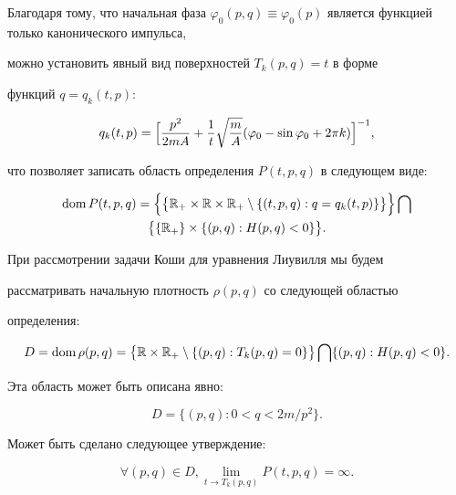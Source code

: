 Благодаря тому, что начальная фаза $\varphi_0(p,q) \equiv

\varphi_0(p)$ является функцией только канонического импульса,

можно установить явный вид поверхностей $T_k(p,q)= t$ в форме

функций $ q= q_k(t,p)$:

$$

q_k(t,p)= \Bigl[ \frac{p^2}{2 mA} +

\frac{1}{t}\sqrt{\frac{m}{A}}(\varphi_0-\sin\varphi_0 + 2 \pi k) \Bigr]^{-1},

$$

 что позволяет записать область определения $P(t,p,q)$ в следующем виде:

\begin{multline*}

\mathop{\rm dom} P(t,p,q) 

= \Bigl\{\bigl\{ \mathbb{R}_{+}\times \mathbb{R}\times

\mathbb{R}_{+} \setminus \{(t,p,q): q= q_k(t,p)\} \bigr\}\Bigr\}\bigcap \\

\bigl \{\{

\mathbb{R}_{+}\}\times\{(p,q): H(p,q)<0 \} \bigr\}.

\end{multline*}

 При рассмотрении задачи Коши для уравнения Лиувилля мы будем

 рассматривать начальную плотность $\rho(p,q)$ со следующей областью

 определения:

$$

 D= \mathop{\rm dom} \rho(p,q) = \bigl\{ \mathbb{R}\times \mathbb{R}_{+} \setminus

\{(p,q): T_k(p,q)= 0 \} \bigr\}\bigcap \{(p,q): H(p,q)<0 \}.

$$

Эта область  может быть описана явно:

$$

 D=\{(p,q): 0<q<{2m}/{p^2} \}.

$$

Может быть сделано следующее утверждение:

$$

  \forall(p,q)\in D,  \lim_{t\rightarrow T_k(p,q)}  P(t,p,q)= \infty.

$$



\smallskip



